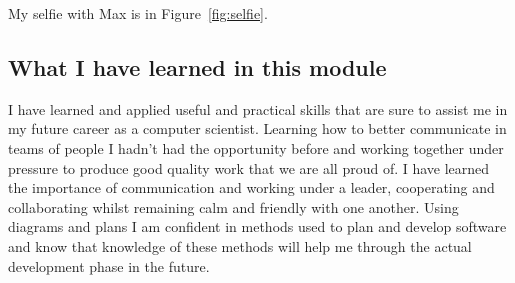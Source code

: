 My selfie with Max is in  Figure~\ref{fig:selfie}.

\subsection{What I have learned in this module}
I have learned and applied useful and practical skills that are sure to assist me in my future career as a computer scientist. Learning how to better communicate in teams of people I hadn't had the opportunity before and working together under pressure to produce good quality work that we are all proud of. I have learned the importance of communication and working under a leader, cooperating and collaborating whilst remaining calm and friendly with one another. Using diagrams and plans I am confident in methods used to plan and develop software and know that knowledge of these methods will help me through the actual development phase in the future.


